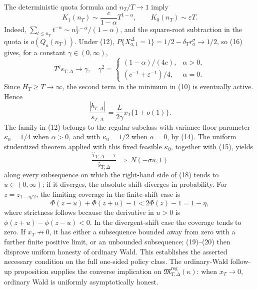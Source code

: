 The deterministic quota formula and \(n_T/T\to1\) imply
\[
 K_1(n_T)\sim\frac{c}{1-\alpha}T^{1-\alpha},
 \qquad K_0(n_T)\sim\varepsilon T.
 \tag{16}
\]
Indeed, \(\sum_{t\leq n_T}t^{-\alpha}\sim n_T^{1-\alpha}/(1-\alpha)\), and the square-root subtraction in the quota is \(o(Q_a(n_T))\).  Under (12), \(P\{X_{a,1}^{\Delta}=1\}=1/2-\delta_T r_a^\sigma\to1/2\), so (16) gives, for a constant \(\gamma\in(0,\infty)\),
\[
 T^q s_{T,\Delta}\longrightarrow\gamma,
 \quad
 \gamma^2=
 \begin{cases}
 (1-\alpha)/(4c),&\alpha>0,\\
 (c^{-1}+\varepsilon^{-1})/4,&\alpha=0.
 \end{cases}
 \tag{17}
\]
Since \(H_T\geq T\to\infty\), the second term in the minimum in (10) is eventually active.  Hence
\[
 \frac{|b_{T,\Delta}|}{s_{T,\Delta}}
 =\frac{L}{2\gamma}x_T\{1+o(1)\}.
 \tag{18}
\]
The family in (12) belongs to the regular subclass with variance-floor parameter \(\kappa_0=1/4\) when \(\alpha>0\), and with \(\kappa_0=1/2\) when \(\alpha=0\), by (14).  The uniform studentized theorem applied with this fixed feasible \(\kappa_0\), together with (15), yields
\[
 \frac{\widehat\tau_{T,\Delta}-\tau}{\widehat s_{T,\Delta}}
 \ \Rightarrow\ N(-\sigma u,1)
 \tag{19}
\]
along every subsequence on which the right-hand side of (18) tends to \(u\in(0,\infty)\); if it diverges, the absolute shift diverges in probability.  For \(z=z_{1-\eta/2}\), the limiting coverage in the finite-shift case is
\[
 \Phi(z-u)+\Phi(z+u)-1<2\Phi(z)-1=1-\eta,
 \tag{20}
\]
where strictness follows because the derivative in \(u>0\) is \(\phi(z+u)-\phi(z-u)<0\).  In the divergent-shift case the coverage tends to zero.  If \(x_T\not\to0\), it has either a subsequence bounded away from zero with a further finite positive limit, or an unbounded subsequence; (19)--(20) then disprove uniform honesty of ordinary Wald.  This establishes the asserted necessary condition on the full one-sided policy class.  The ordinary-Wald follow-up proposition supplies the converse implication on \(\mathfrak M_{T,\Delta}^{\mathrm{reg}}(\kappa)\): when \(x_T\to0\), ordinary Wald is uniformly asymptotically honest.

